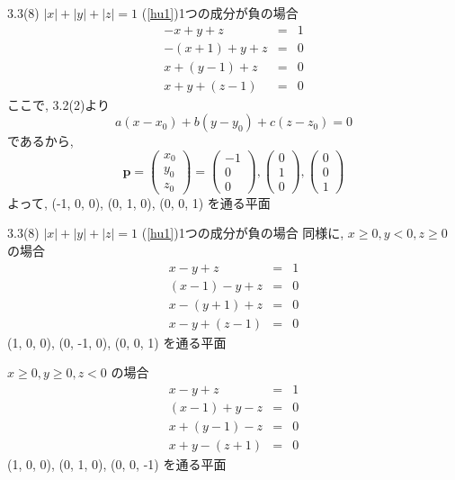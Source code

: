 \documentclass{beamer}
\begin{document}
\begin{frame}{3.3(8) $|x| + |y| + |z|  = 1$ \hspace{5mm} (\ref{hu1})1つの成分が負の場合}
  \begin{eqnarray*}
    -x + y + z &=& 1\\
    -(x+1) + y + z &=& 0\\
    x + (y-1) + z &=& 0\\
    x + y + (z-1) &=& 0
  \end{eqnarray*}
  ここで, 3.2(2)より
  \begin{equation*}
    a(x-x_0) + b(y-y_0) + c(z-z_0) = 0
  \end{equation*}
  であるから,
  \begin{equation*}
    \bm{p} = 
    \begin{pmatrix}
      x_0\\
      y_0\\
      z_0
    \end{pmatrix} =
    \begin{pmatrix}
      -1\\
      0\\
      0
    \end{pmatrix} , 
    \begin{pmatrix}
      0\\
      1\\
      0
    \end{pmatrix} , 
    \begin{pmatrix}
      0\\
      0\\
      1
    \end{pmatrix} 
  \end{equation*}
  よって, (-1, 0, 0), (0, 1, 0), (0, 0, 1) を通る平面
\end{frame}



\begin{frame}{3.3(8) $|x| + |y| + |z|  = 1$ \hspace{5mm} (\ref{hu1})1つの成分が負の場合}
  同様に, $x \geq 0, y < 0, z \geq 0$ の場合 
  \begin{eqnarray*}
    x - y + z &=& 1\\
    (x-1) - y + z &=& 0\\
    x - (y+1) + z &=& 0\\
    x - y + (z-1) &=& 0
  \end{eqnarray*}
  (1, 0, 0), (0, -1, 0), (0, 0, 1) を通る平面 \\ \vspace{5mm}

  $x \geq 0, y \geq 0, z < 0$ の場合 
  \begin{eqnarray*}
    x - y + z &=& 1\\
    (x-1) + y - z &=& 0\\
    x + (y-1) - z &=& 0\\
    x + y - (z+1) &=& 0
  \end{eqnarray*}
  (1, 0, 0), (0, 1, 0), (0, 0, -1) を通る平面
\end{frame}
\end{document}
